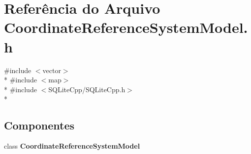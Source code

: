 \section{Referência do Arquivo Coordinate\+Reference\+System\+Model.\+h}
\label{_coordinate_reference_system_model_8h}
{\ttfamily \#include $<$vector$>$}\\*
{\ttfamily \#include $<$map$>$}\\*
{\ttfamily \#include $<$S\+Q\+Lite\+Cpp/\+S\+Q\+Lite\+Cpp.\+h$>$}\\*
\subsection*{Componentes}
\begin{DoxyCompactItemize}
\item 
class {\bf Coordinate\+Reference\+System\+Model}
\end{DoxyCompactItemize}
